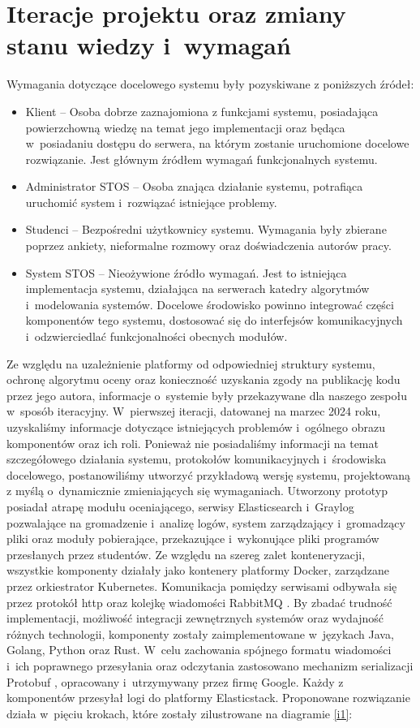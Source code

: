 \section{Iteracje projektu oraz zmiany stanu wiedzy i~wymagań}
Wymagania dotyczące docelowego systemu były pozyskiwane z poniższych źródeł:
\begin{itemize}
    \item Klient -- Osoba dobrze zaznajomiona z funkcjami systemu, posiadająca powierzchowną wiedzę na temat jego implementacji oraz będąca w~posiadaniu dostępu do serwera, na którym zostanie uruchomione docelowe rozwiązanie. Jest głównym źródłem wymagań funkcjonalnych systemu.
    \item Administrator STOS -- Osoba znająca działanie systemu, potrafiąca uruchomić system i~rozwiązać istniejące problemy.
    \item Studenci -- Bezpośredni użytkownicy systemu. Wymagania były zbierane poprzez ankiety, nieformalne rozmowy oraz doświadczenia autorów pracy.
    \item System STOS -- Nieożywione źródło wymagań. Jest to istniejąca implementacja systemu, działająca na serwerach katedry algorytmów i~modelowania systemów. Docelowe środowisko powinno  integrować części komponentów tego systemu, dostosować się do interfejsów komunikacyjnych i~odzwierciedlać funkcjonalności obecnych modułów.
\end{itemize}
Ze względu na uzależnienie platformy od odpowiedniej struktury systemu, ochronę algorytmu oceny oraz konieczność uzyskania zgody na publikację kodu przez jego autora, informacje o~systemie były przekazywane dla naszego zespołu w~sposób iteracyjny.
\newline \indent W~pierwszej iteracji, datowanej na marzec 2024 roku, uzyskaliśmy informacje dotyczące istniejących problemów i~ogólnego obrazu komponentów oraz ich roli. Ponieważ nie posiadaliśmy informacji na temat szczegółowego działania systemu, protokołów komunikacyjnych i~środowiska docelowego, postanowiliśmy utworzyć przykładową wersję systemu, projektowaną z myślą o~dynamicznie zmieniających się wymaganiach. Utworzony prototyp posiadał atrapę modułu oceniającego, serwisy Elasticsearch i~Graylog pozwalające na gromadzenie i~analizę logów, system zarządzający i~gromadzący pliki oraz moduły pobierające, przekazujące i~wykonujące pliki programów przesłanych przez studentów. Ze względu na szereg zalet konteneryzacji, wszystkie komponenty działały jako kontenery platformy Docker, zarządzane przez orkiestrator Kubernetes. Komunikacja pomiędzy serwisami odbywała się przez protokół http oraz kolejkę wiadomości RabbitMQ \cite{rabbit}. By zbadać trudność implementacji, możliwość integracji zewnętrznych systemów oraz wydajność różnych technologii, komponenty zostały zaimplementowane w~językach Java, Golang, Python oraz Rust. W~celu zachowania spójnego formatu wiadomości i~ich poprawnego przesyłania oraz odczytania zastosowano mechanizm serializacji Protobuf \cite{protobuf}, opracowany i~utrzymywany przez firmę Google. Każdy z komponentów przesyłał logi do platformy Elasticstack. Proponowane rozwiązanie działa w~pięciu krokach, które zostały zilustrowane na diagramie \ref{i1}:
